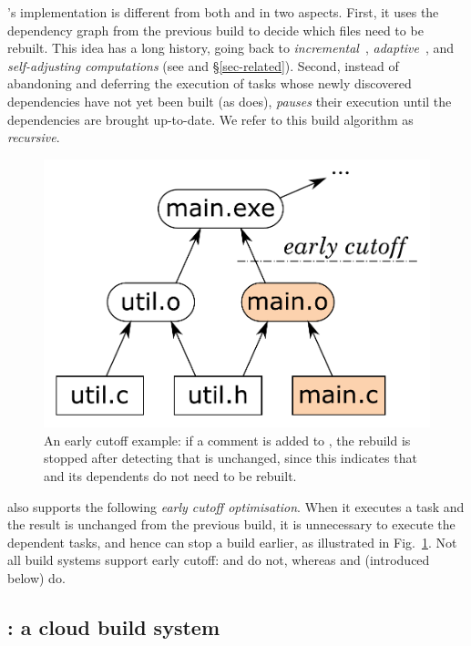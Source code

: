 \Shake's implementation is different from both \Make and \Excel in two aspects.
First, it uses the dependency graph from the previous build to decide which
files need to be rebuilt. This idea has a long history, going back to
\emph{incremental}~\cite{demers1981incremental},
\emph{adaptive}~\cite{acar2002adaptive}, and
\emph{self-adjusting computations} (see \cite{acar2007selfadjusting} and \S\ref{sec-related}).
Second, instead of abandoning
and deferring the execution of tasks whose newly discovered dependencies have
not yet been built (as \Excel does), \Shake \emph{pauses} their execution until
the dependencies are brought up-to-date. We refer to this build algorithm as
\emph{recursive}.

\begin{figure}[h]
\centerline{\includegraphics[scale=0.28]{fig/shake-example-cutoff.pdf}}
\vspace{-2mm}
\caption{An early cutoff example: if a comment is added to , the
rebuild is stopped after detecting that  is unchanged, since this
indicates that  and its dependents do not need to be
rebuilt.\label{fig-cutoff}}
\end{figure}

\Shake also supports the following \emph{early cutoff optimisation}. When it
executes a task and the result is unchanged from the previous build, it is
unnecessary to execute the dependent tasks, and hence \Shake can stop a build
earlier, as illustrated in Fig.~\ref{fig-cutoff}. Not all build systems support
early cutoff: \Make and \Excel do not, whereas \Shake and \Bazel (introduced
below) do.

\subsection{\Bazel: a cloud build system}
\label{sec-background-bazel}

